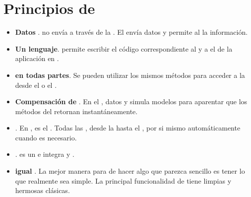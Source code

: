 \section{Principios de \meteor}
\begin{itemize}
	\item \textbf{Datos \onthewire}. \meteor no envía \htmlNAME a través de la \network. El \serverAS envía datos y permite al \clientAS \render la información.

	\item \textbf{Un lenguaje}. \meteor permite escribir el código correspondiente al \clientAS y a el \serverAS de la aplicación en \javaScriptNAME.
	\item \textbf{\dataBase en todas partes}. Se pueden utilizar los mismos métodos para acceder a la \dataBase desde el \clientAS o el \serverAS.

	\item \textbf{Compensación de \latency}. En el \clientAS, \meteor \prefetches datos y simula modelos para aparentar que los métodos del \serverAS retornan instantáneamente.

	\item \textbf{\fullstack \reactivity}. En \meteor, \realTimeINT es el . Todas las \layers, desde la \dataBase hasta el \template, \update por si mismo automáticamente cuando es necesario.

	\item \textbf{\embraceecosystem}. \meteor es un \openSource e integra \tools y \frameworks \openSource.

	\item \textbf{\simplicity igual \productivity}. La mejor manera para de hacer algo que parezca sencillo es tener lo que realmente sea simple. La principal funcionalidad de \meteor tiene limpias y hermosas \apis clásicas.

\end{itemize}

